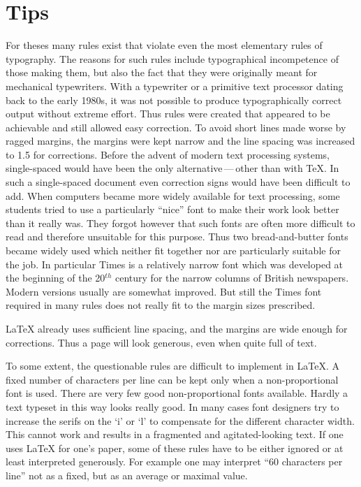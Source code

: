 \section{Tips}

For theses  many rules exist that violate even the most
elementary rules of typography. The reasons for such rules include
typographical incompetence of those making them, but also the fact
that they were originally meant for mechanical typewriters. With a
typewriter or a primitive text processor dating back to the early
1980s, it was not possible to produce typographically correct output
without extreme effort. Thus rules were created that appeared to be
achievable and still allowed easy correction. To avoid short lines
made worse by ragged margins, the margins were kept narrow and the
line spacing was increased to 1.5 for corrections. Before the advent
of modern text processing systems, single-spaced would have been the
only alternative\,---\,other than with \TeX. In such a single-spaced
document even correction signs would have been difficult to add. When
computers became more widely available for text processing, some
students tried to use a particularly ``nice'' font to make their work
look better than it really was. They forgot however that such fonts
are often more difficult to read and therefore unsuitable for this
purpose. Thus two bread-and-butter fonts became widely used which
neither fit together nor are particularly suitable for the job. In
particular Times is a relatively narrow font which was developed at
the beginning of the 20$^{th}$ century for the narrow columns of
British newspapers. Modern versions usually are somewhat improved. But
still the Times font required in many rules does not really fit to the
margin sizes prescribed.

{\LaTeX} already uses sufficient line spacing, and the margins are
wide enough for corrections. Thus a page will look generous, even when
quite full of text.

To some extent, the questionable rules are difficult to implement in
{\LaTeX}. A fixed number of characters per line can be kept only when
a non-proportional font is used. There are very few good
non-proportional fonts available. Hardly a text typeset in this way
looks really good. In many cases font designers try to increase the
serifs on the `i' or `l' to compensate for the different character
width. This cannot work and results in a fragmented and
agitated-looking text. If one uses {\LaTeX} for one's paper, some of
these rules have to be either ignored or at least interpreted
generously. For example one may interpret ``60 characters per line''
not as a fixed, but as an average or maximal value.%

